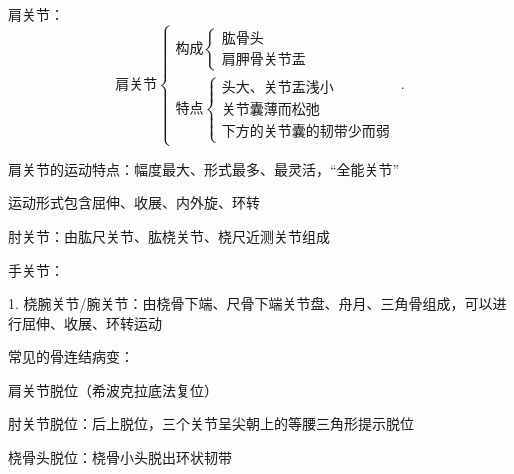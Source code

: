 \begin{notation}
	肩关节：
	\[
		\text{肩关节}
		\begin{cases}
			\text{构成}\begin{cases}
				\text{肱骨头}\\
				\text{肩胛骨关节盂}
			\end{cases}\\
			\text{特点}\begin{cases}
				\text{头大、关节盂浅小}\\
				\text{关节囊薄而松弛}\\
				\text{下方的关节囊的韧带少而弱}
			\end{cases}
		\end{cases}
	.\] 

	肩关节的运动特点：幅度最大、形式最多、最灵活，“全能关节”

	运动形式包含屈伸、收展、内外旋、环转
\end{notation}
\begin{notation}
	肘关节：由肱尺关节、肱桡关节、桡尺近测关节组成
\end{notation}
\begin{notation}
	手关节：

	1. 桡腕关节/腕关节：由桡骨下端、尺骨下端关节盘、舟月、三角骨组成，可以进行屈伸、收展、环转运动
\end{notation}
\begin{notation}
	常见的骨连结病变：
	
	肩关节脱位（希波克拉底法复位）

	肘关节脱位：后上脱位，三个关节呈尖朝上的等腰三角形提示脱位

	桡骨头脱位：桡骨小头脱出环状韧带
\end{notation}
